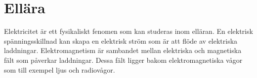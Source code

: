 \chapter{Ellära}
\label{ch:ellaera}

Elektricitet är ett fysikaliskt fenomen som kan studeras inom elläran.
En elektrisk spänningsskillnad kan skapa en elektrisk ström som är att flöde av
elektriska laddningar.
Elektromagnetism är sambandet mellan elektriska och magnetiska fält som påverkar
laddningar.
Dessa fält ligger bakom elektromagnetiska vågor som till exempel ljus och
radiovågor.
